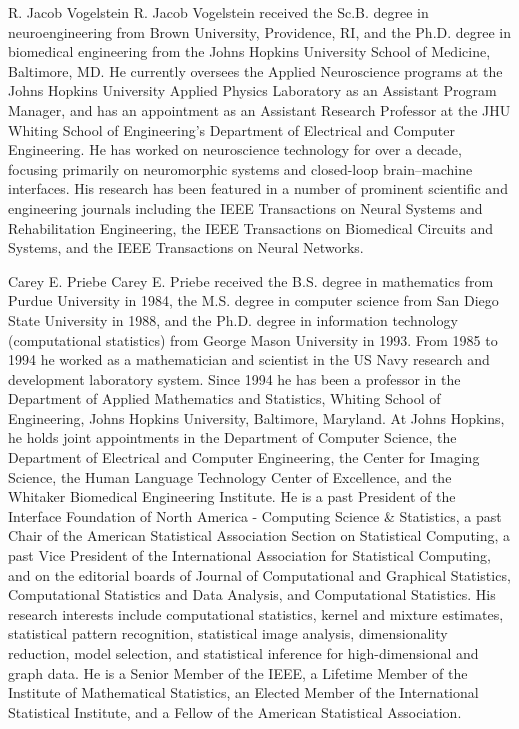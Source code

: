 \documentclass[10pt,journal,cspaper,compsoc]{IEEEtran}
\begin{document}

\begin{IEEEbiographynophoto}{R. Jacob Vogelstein}
R. Jacob Vogelstein received the Sc.B. degree in neuroengineering from Brown University, Providence, RI, and the Ph.D. degree in biomedical engineering from the Johns Hopkins University School of Medicine, Baltimore, MD.  He currently oversees the Applied Neuroscience programs at the Johns Hopkins University Applied Physics Laboratory as an Assistant Program Manager, and has an appointment as an Assistant Research Professor at the JHU Whiting School of Engineering’s Department of Electrical and Computer Engineering. He has worked on neuroscience technology for over a decade, focusing primarily on neuromorphic systems and closed-loop brain–machine interfaces. His research has been featured in a number of prominent scientific and engineering journals including the IEEE Transactions on Neural Systems and Rehabilitation Engineering, the IEEE Transactions on Biomedical Circuits and Systems, and the IEEE Transactions on Neural Networks.  
\end{IEEEbiographynophoto}

\begin{IEEEbiographynophoto}{Carey E. Priebe}
Carey E. Priebe received the B.S. degree in mathematics from Purdue University in 1984, the M.S. degree in computer science from San Diego State University in 1988, and the Ph.D. degree in information technology (computational statistics) from George Mason University in 1993. From 1985 to 1994 he worked as a mathematician and scientist in the US Navy research and development laboratory system. Since 1994 he has been a professor in the Department of Applied Mathematics and Statistics, Whiting School of Engineering, Johns Hopkins University, Baltimore, Maryland. At Johns Hopkins, he holds joint appointments in the Department of Computer Science, the Department of Electrical and Computer Engineering, the Center for Imaging Science, the Human Language Technology Center of Excellence, and the Whitaker Biomedical Engineering Institute. He is a past President of the Interface Foundation of North America - Computing Science \& Statistics, a past Chair of the American Statistical Association Section on Statistical Computing, a past Vice President of the International Association for Statistical Computing, and on the editorial boards of Journal of Computational and Graphical Statistics, Computational Statistics and Data Analysis, and Computational Statistics. His research interests include computational statistics, kernel and mixture estimates, statistical pattern recognition, statistical image analysis, dimensionality reduction, model selection, and statistical inference for high-dimensional and graph data. He is a Senior Member of the IEEE, a Lifetime Member of the Institute of Mathematical Statistics, an Elected Member of the International Statistical Institute, and a Fellow of the American Statistical Association.
\end{IEEEbiographynophoto}



% 
\end{document}
